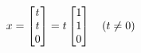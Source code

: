 \documentclass[preview]{standalone}
\begin{document}
\begin{align*}
\special{dvisvgm:raw <g id='unique000'>}x = \begin{bmatrix} t \\ t \\ 0 \end{bmatrix} = t \begin{bmatrix} 1 \\ 1 \\ 0 \end{bmatrix} \quad (t \neq 0)\special{dvisvgm:raw </g>}
\end{align*}
\end{document}
